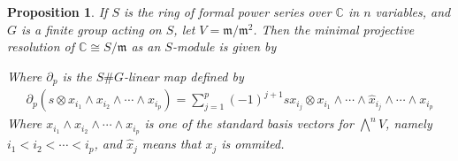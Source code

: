 \documentclass[11pt, a4paper, english]{article}
\newtheorem{prop}{Proposition}
\numberwithin{prop}{section}
\numberwithin{lemma}{section}
\numberwithin{theorem}{section}
\numberwithin{defin}{section}
\numberwithin{example}{section}
\newcommand{\C}{\mathbb{C}}
\begin{document}
\begin{prop}
If $S$ is the ring of formal power series over $\C$ in $n$ variables, and $G$ is a finite group acting on $S$, let $V=\mathfrak{m}/\mathfrak{m}^2$. Then the minimal projective resolution of $\C \cong S/\mathfrak{m}$ as an $S$-module is given by
\begin{center}
\end{center}
Where $\partial_p$ is the $S\#G$-linear map defined by
\begin{align*}
\partial_p(s \otimes x_{i_1} \wedge x_{i_2} \wedge \cdots \wedge x_{i_p}) = \sum_{j=1}^{p} (-1)^{j+1} sx_{i_j} \otimes x_{i_1} \wedge \cdots \wedge \hat{x}_{i_{j}} \wedge \cdots \wedge x_{i_{p}} 
\end{align*}
Where $x_{i_1} \wedge x_{i_2} \wedge \cdots \wedge x_{i_p}$ is one of the standard basis vectors for $\bigwedge\limits^n V$, namely $i_1 < i_2 < \cdots < i_p$, and  $\hat{x}_j$ means that $x_j$ is ommited.


\end{prop}
\end{document}

